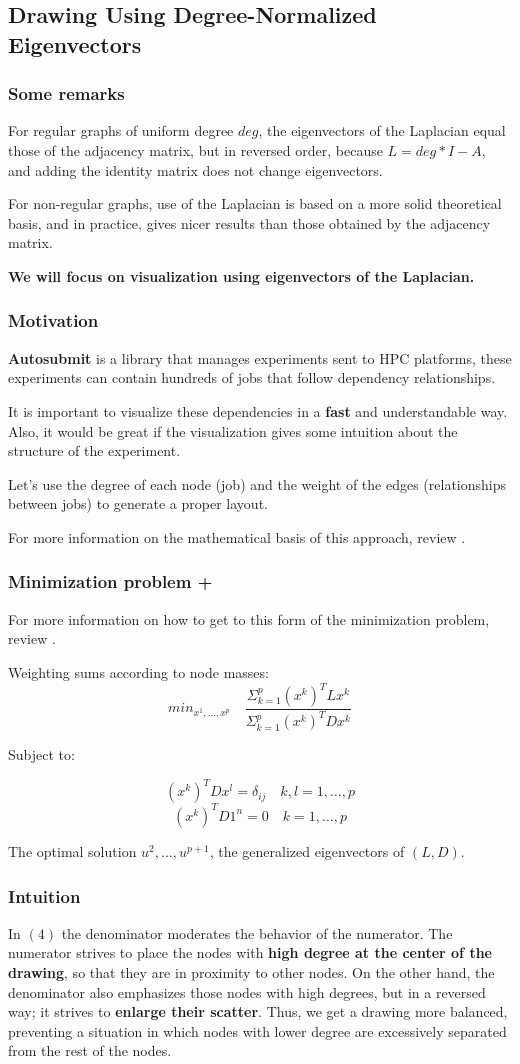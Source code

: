 \documentclass{beamer}
\begin{document}
\subsection{Drawing Using Degree-Normalized Eigenvectors}
\frame
{
  	\frametitle{Some remarks}
	For regular graphs of uniform degree $deg$, the eigenvectors of the Laplacian equal those of the adjacency matrix, but in reversed order, because $L = deg * I - A$, and adding the identity matrix does not change eigenvectors.
	
	For non-regular graphs, use of the Laplacian is based on a more solid theoretical basis, and in practice, gives nicer results than those obtained by the adjacency matrix. 
	
	\textbf{We will focus on visualization using eigenvectors of the Laplacian.}
}
\frame
{
	\frametitle{Motivation}
	\textbf{Autosubmit} is a library that manages experiments sent to HPC platforms, these experiments can contain hundreds of jobs that follow dependency relationships. 
	
	It is important to visualize these dependencies in a \textbf{fast} and understandable way. Also, it would be great if the visualization gives some intuition about the structure of the experiment.
	
	Let's use the degree of each node (job) and the weight of the edges (relationships between jobs) to generate a proper layout.
	
	For more information on the mathematical basis of this approach, review \cite{koren}.
	
}
\frame
{
	\frametitle{Minimization problem +}
	
	For more information on how to get to this form of the minimization problem, review \cite{koren}.
	
	Weighting sums according to node masses:
	\begin{equation}
	min_{x^1, \dots, x^p} \quad \frac{\Sigma_{k=1}^{p} (x^k)^{T} Lx^k}{\Sigma_{k=1}^{p} (x^k)^{T} Dx^k}
	\end{equation}
	
	Subject to:
	
	$$(x^k)^T Dx^l = \delta_{ij} \quad k,l = 1, \dots, p$$
	$$(x^k)^T D1^n = 0  \quad k = 1, \dots, p$$
	
	The optimal solution $u^2, \dots, u^{p+1}$, the generalized eigenvectors of $(L,D)$.
}
\frame
{
	\frametitle{Intuition}
	
	In $(4)$ the denominator moderates the behavior of the numerator. The numerator strives to place the nodes with \textbf{high degree at the center of the drawing}, so that they are in proximity to other nodes. On the other hand, the denominator also emphasizes those nodes with high degrees, but in a reversed way; it strives to \textbf{enlarge their scatter}. Thus, we get a drawing more balanced, preventing a situation in which nodes with lower degree are excessively separated from the rest of the nodes.
	
}
\end{document}

